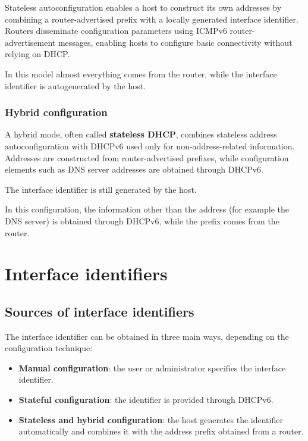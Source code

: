 Stateless autoconfiguration enables a host to construct its own addresses by combining a router-advertised prefix with a locally generated interface identifier. Routers disseminate configuration parameters using ICMPv6 router-advertisement messages, enabling hosts to configure basic connectivity without relying on DHCP.

 In this model almost everything comes from the router, while the interface identifier is autogenerated by the host.

\subsubsection*{Hybrid configuration}

A hybrid mode, often called \textbf{stateless DHCP}, combines stateless address autoconfiguration with DHCPv6 used only for non-address-related information. Addresses are constructed from router-advertised prefixes, while configuration elements such as DNS server addresses are obtained through DHCPv6.

 The interface identifier is still generated by the host.

In this configuration, the information other than the address (for example the DNS server) is obtained through DHCPv6, while the prefix comes from the router.

\section{Interface identifiers}

\subsection{Sources of interface identifiers}

The interface identifier can be obtained in three main ways,
depending on the configuration technique:
\begin{itemize}
	\item \textbf{Manual configuration}: the user or administrator
	specifies the interface identifier.
	\item \textbf{Stateful configuration}: the identifier is provided
	through DHCPv6.
	\item \textbf{Stateless and hybrid configuration}: the host generates
	the identifier automatically and combines it with the address prefix
	obtained from a router.
\end{itemize}

